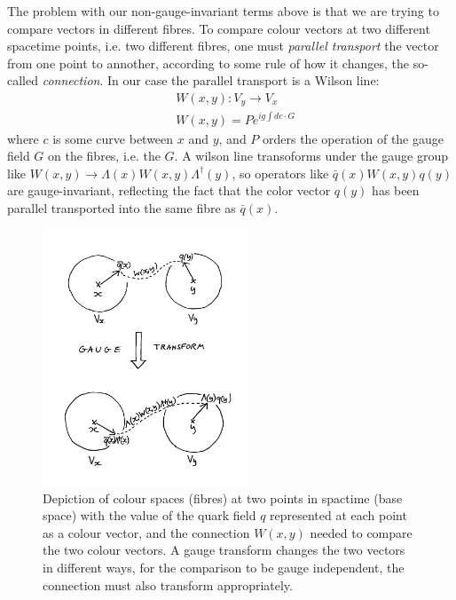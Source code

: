 The problem with our non-gauge-invariant terms above is that we are trying to compare vectors in different fibres. To compare colour vectors at two different spacetime points, i.e. two different fibres, one must {\it{parallel transport}} the vector from one point to annother, according to some rule of how it changes, the so-called {\it{connection}}. In our case the parallel transport is a Wilson line:
\begin{align}
\nonumber  &W(x,y) : V_y \to V_x \\ &W(x,y) = Pe^{ig\int dc\cdot G }
\end{align}
where $c$ is some curve between $x$ and $y$, and $P$ orders the operation of the gauge field $G$ on the fibres, i.e. the $G$. A wilson line transoforms under the gauge group like $W(x,y)\to \Lambda(x)W(x,y)\Lambda^{\dagger}(y)$, so operators like $\bar{q}(x)W(x,y)q(y)$ are gauge-invariant, reflecting the fact that the color vector $q(y)$ has been parallel transported into the same fibre as $\bar{q}(x)$.

\begin{figure}
  \begin{center}
    \vspace{-10pt}
    \includegraphics[width=0.55\textwidth]{images/fibres.jpg}
    \caption{Depiction of colour spaces (fibres) at two points in spactime (base space) with the value of the quark field $q$ represented at each point as a colour vector, and the connection $W(x,y)$ needed to compare the two colour vectors. A gauge transform changes the two vectors in different ways, for the comparison to be gauge independent, the connection must also transform appropriately.}
  \end{center}
  \vspace{-10pt}
\end{figure}


